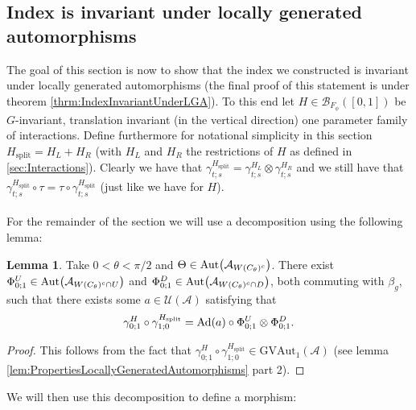\documentclass[12pt,a4paper,twoside]{article}
\let\originalleft\left
\let\originalright\right
\renewcommand{\left}{\mathopen{}\mathclose\bgroup\originalleft}
\renewcommand{\right}{\aftergroup\egroup\originalright}
\newcommand{\UU}{\mathcal U}
\newcommand{\BB}{\mathcal B}
\renewcommand{\AA}{\mathcal A}
\newcommand{\Ad}[1]{\textrm{Ad}\left(#1\right)}
\newcommand{\Aut}[1]{\textrm{Aut}\left(#1\right)}
\theoremstyle{definition}
\newtheorem{lemma}[theorem]{Lemma}
\numberwithin{equation}{section}
\begin{document}
\subsection{Index is invariant under locally generated automorphisms}\label{sec:IndexInvariantUnderLGA}
The goal of this section is now to show that the index we constructed is invariant under locally generated automorphisms (the final proof of this statement is under theorem \ref{thrm:IndexInvariantUnderLGA}). To this end let $H\in\BB_{F_\phi}([0,1])$ be $G$-invariant, translation invariant (in the vertical direction) one parameter family of interactions. Define furthermore for notational simplicity in this section $H_{\text{split}}=H_L+H_R$ (with $H_L$ and $H_R$ the restrictions of $H$ as defined in \ref{sec:Interactions}). Clearly we have that $\gamma^{H_{\text{split}}}_{t;s}=\gamma^{H_L}_{t;s}\otimes\gamma^{H_R}_{t;s}$ and we still have that $\gamma^{H_{\text{split}}}_{t;s}\circ\tau=\tau\circ\gamma^{H_{\text{split}}}_{t;s}$ (just like we have for $H$).\\\\
For the remainder of the section we will use a decomposition using the following lemma:
\begin{lemma}\label{lem:DefinitionOfGroupMorphismVAutEquation}
	Take $0<\theta<\pi/2$ and $\Theta\in \Aut{\AA_{W(C_\theta)^c}}$. There exist $\Phi^U_{0;1}\in\Aut{\AA_{W(C_\theta)^c\cap U}}$ and $\Phi^D_{0;1}\in\Aut{\AA_{W(C_\theta)^c\cap D}}$, both commuting with $\beta_g$, such that there exists some $a\in\UU(\AA)$ satisfying that
	\begin{equation}\label{eq:DefinitionOfGroupMorphismVAutEquation}
	\gamma^H_{0;1}\circ\gamma^{H_\text{split}}_{1;0}=\Ad{a}\circ \Phi^U_{0;1}\otimes\Phi^D_{0;1}.
	\end{equation}
\end{lemma}
\begin{proof}
	This follows from the fact that $\gamma^H_{0;1}\circ\gamma^{H_\text{split}}_{1;0}\in \textrm{GVAut}_1(\AA)$ (see lemma \ref{lem:PropertiesLocallyGeneratedAutomorphisms} part 2).
\end{proof}
We will then use this decomposition to define a morphism:
\end{document}
